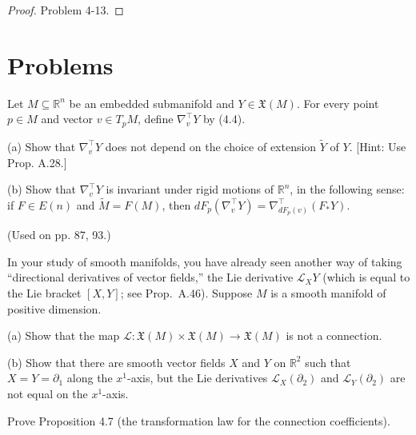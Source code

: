 \begin{proof}
Problem 4-13.
\end{proof}

\section{Problems}

\begin{exercise}
\label{prob:embedded-submanifold-covariant-derivative}
Let $M \subseteq \mathbb{R}^n$ be an embedded submanifold and $Y \in \mathfrak{X}(M)$. For every point $p \in M$ and vector $v \in T_p M$, define $\nabla_v^\top Y$ by (4.4).

(a) Show that $\nabla_v^\top Y$ does not depend on the choice of extension $\tilde{Y}$ of $Y$. [Hint: Use Prop. A.28.]

(b) Show that $\nabla_v^\top Y$ is invariant under rigid motions of $\mathbb{R}^n$, in the following sense: if $F \in E(n)$ and $\tilde{M} = F(M)$, then $dF_p(\nabla_v^\top Y) = \nabla_{dF_p(v)}^\top (F_* Y)$.

(Used on pp. 87, 93.)
\end{exercise}

\begin{exercise}\label{prob:lie-derivative-not-connection}
In your study of smooth manifolds, you have already seen another way of taking ``directional derivatives of vector fields,'' the Lie derivative $\mathcal{L}_X Y$ (which is equal to the Lie bracket $[X,Y]$; see Prop.~A.46). Suppose $M$ is a smooth manifold of positive dimension.

(a) Show that the map $\mathcal{L}: \mathfrak{X}(M) \times \mathfrak{X}(M) \to \mathfrak{X}(M)$ is not a connection.

(b) Show that there are smooth vector fields $X$ and $Y$ on $\mathbb{R}^2$ such that $X = Y = \partial_1$ along the $x^1$-axis, but the Lie derivatives $\mathcal{L}_X(\partial_2)$ and $\mathcal{L}_Y(\partial_2)$ are not equal on the $x^1$-axis.
\end{exercise}

\begin{exercise}\label{prob:transformation-law-connection}
Prove Proposition 4.7 (the transformation law for the connection coefficients).
\end{exercise}

